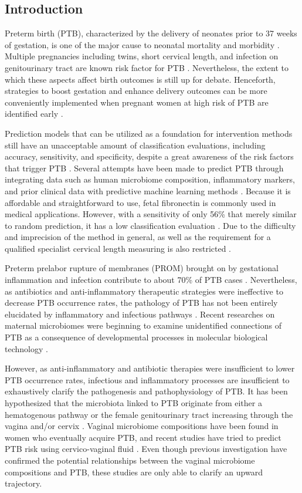 \documentclass[11pt, a4paper, onecolumn, oneside]{report}
\begin{document}
        \subsection{Introduction}
            Preterm birth (PTB), characterized by the delivery of neonates prior to 37 weeks of gestation, is one of the major cause to neonatal mortality and morbidity \cite{PTB-rate-1}. Multiple pregnancies including twins, short cervical length, and infection on genitourinary tract are known risk factor for PTB \cite{PTB-cause-1}. Nevertheless, the extent to which these aspects affect birth outcomes is still up for debate. Henceforth, strategies to boost gestation and enhance delivery outcomes can be more conveniently implemented when pregnant women at high risk of PTB are identified early \cite{PTB-care-1}.

            Prediction models that can be utilized as a foundation for intervention methods still have an unacceptable amount of classification evaluations, including accuracy, sensitivity, and specificity, despite a great awareness of the risk factors that trigger PTB \cite{PTB-prediction-1}. Several attempts have been made to predict PTB through integrating data such as human microbiome composition, inflammatory markers, and prior clinical data with predictive machine learning methods \cite{PTB-prediction-2}. Because it is affordable and straightforward to use, fetal fibronectin is commonly used in medical applications. However, with a sensitivity of only 56\% that merely similar to random prediction, it has a low classification evaluation \cite{PTB-prediction-3}. Due to the difficulty and imprecision of the method in general, as well as the requirement for a qualified specialist cervical length measuring is also restricted \cite{PTB-prediction-4}.

            Preterm prelabor rupture of membranes (PROM) brought on by gestational inflammation and infection contribute to about 70\% of PTB cases \cite{PTB-prediction-5}. Nevertheless, as antibiotics and anti-inflammatory therapeutic strategies were ineffective to decrease PTB occurrence rates, the pathology of PTB has not been entirely elucidated by inflammatory and infectious pathways \cite{PTB-mechanism-1}. Recent researches on maternal microbiomes were beginning to examine unidentified connections of PTB as a consequence of developmental processes in molecular biological technology \cite{PTB-mechanism-2}.

            However, as anti-inflammatory and antibiotic therapies were insufficient to lower PTB occurrence rates, infectious and inflammatory processes are insufficient to exhaustively clarify the pathogenesis and pathophysiology of PTB. It has been hypothesized that the microbiota linked to PTB originate from either a hematogenous pathway or the female genitourinary tract increasing through the vagina and/or cervix \cite{PTB-mechanism-3}. Vaginal microbiome compositions have been found in women who eventually acquire PTB, and recent studies have tried to predict PTB risk using cervico-vaginal fluid \cite{PTB-mechanism-4}. Even though previous investigation have confirmed the potential relationships between the vaginal microbiome compositions and PTB, these studies are only able to clarify an upward trajectory.
\end{document}

